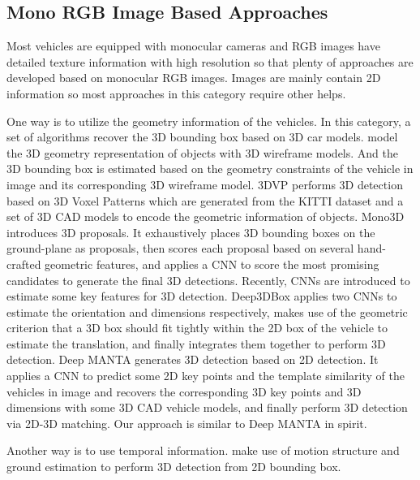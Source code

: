 

\subsection{Mono RGB Image Based Approaches}
Most vehicles are equipped with monocular cameras and RGB images have detailed texture information with high resolution so that plenty of approaches are developed based on monocular RGB images. Images are mainly contain 2D information so most approaches in this category require other helps. 

One way is to utilize the geometry information of the vehicles. In this category, a set of algorithms recover the 3D bounding box based on 3D car models. \cite{834, 741} model the 3D geometry representation of objects with 3D wireframe models. And the 3D bounding box is estimated based on the geometry constraints of the vehicle in image and its corresponding 3D wireframe model. 3DVP \cite{xiang2015data} performs 3D detection based on 3D Voxel Patterns which are generated from the KITTI dataset \cite{Geiger2012CVPR} and a set of 3D CAD models to encode the geometric information of objects. Mono3D \cite{cvpr16chen} introduces 3D proposals. It exhaustively places 3D bounding boxes on the ground-plane as proposals, then scores each proposal based on several hand-crafted geometric features, and applies a CNN to score the most promising candidates to generate the final 3D detections. Recently, CNNs are introduced to estimate some key features for 3D detection. Deep3DBox \cite{DBLP:journals/corr/MousavianAFK16} applies two CNNs to estimate the orientation and dimensions respectively, makes use of the geometric criterion that a 3D box should fit tightly within the 2D box of the vehicle to estimate the translation, and finally integrates them together to perform 3D detection. Deep MANTA \cite{DBLP:journals/corr/ChabotCRTC17} generates 3D detection based on 2D detection. It applies a CNN to predict some 2D key points and the template similarity of the vehicles in image and recovers the corresponding 3D key points and 3D dimensions with some 3D CAD vehicle models, and finally perform 3D detection via 2D-3D matching. Our approach is similar to Deep MANTA in spirit.

Another way is to use temporal information. \cite{7780838, 7298997} make use of motion structure and ground estimation to perform 3D detection from 2D bounding box.


